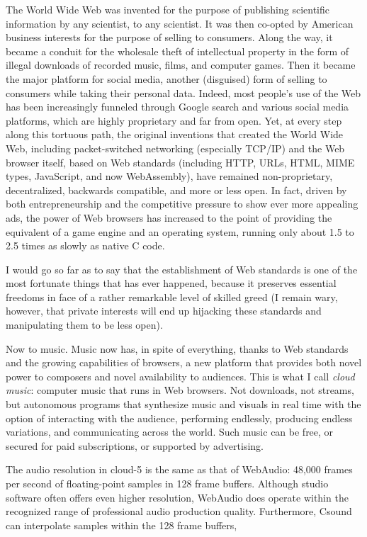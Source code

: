 \documentclass[runningheads,a4paper]{llncs}
\begin{document}
The World Wide Web was invented for the purpose of publishing scientific information by any scientist, to any scientist. It was then co-opted by American business interests for the purpose of selling to consumers. Along the way, it became a conduit for the wholesale theft of intellectual property in the form of illegal downloads of recorded music, films, and computer games. Then it became the major platform for social media, another (disguised) form of selling to consumers while taking their personal data. Indeed, most people's use of the Web has been increasingly funneled through Google search and various social media platforms, which are highly proprietary and far from open. Yet, at every step along this tortuous path, the original inventions that created the World Wide Web, including packet-switched networking (especially TCP/IP) and the Web browser itself, based on  Web standards (including HTTP, URLs, HTML, MIME types, JavaScript, and now WebAssembly), have remained non-proprietary, decentralized, backwards compatible, and more or less open. In fact, driven by both entrepreneurship and the competitive pressure to show ever more appealing ads, the power of Web browsers has increased to the point of providing the equivalent of a game engine and an operating system, running only about 1.5 to 2.5  times as slowly as native C code.

I would go so far as to say that the establishment of Web standards is one of the most fortunate things that has ever happened, because it preserves essential freedoms in face of a rather remarkable level of skilled greed (I remain wary, however, that private interests will end up hijacking these standards and manipulating them to be less open).

Now to music. Music now has, in spite of everything, thanks to Web standards and the growing capabilities of browsers, a new platform that provides both novel power to composers and novel availability to audiences. This is what I call \emph{cloud music}: computer music that runs in Web browsers. Not downloads, not streams, but autonomous programs that synthesize music and visuals in real time with the option of interacting with the audience, performing endlessly, producing endless variations, and communicating across the world. Such music can be free, or secured for paid subscriptions, or supported by advertising. 

The audio resolution in cloud-5 is the same as that of WebAudio: 48,000 frames per second of floating-point samples in 128 frame buffers. Although studio software often offers even higher resolution, WebAudio does operate within the recognized range of professional audio production quality. Furthermore, Csound can interpolate samples within the 128 frame buffers,
\end{document}
